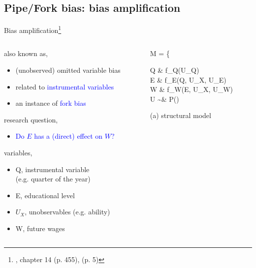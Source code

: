 \subsection{Pipe/Fork bias: bias amplification}
%
%
\begin{frame}[t, negative]
	\subsectionpage
\end{frame}
%
%
\begin{frame}
	{Bias amplification\footnote{\citet{McElreath_2020}, chapter 14 (p. 455), \citet{Cinelli_et_al_2021} (p. 5)}}
	\begin{columns}
		\begin{column}{0.5\textwidth}
			also known as,
			\begin{itemize}
				\item (unobserved) omitted variable bias
				\item related to \textcolor{blue}{instrumental variables}
				\item an instance of \textcolor{blue}{fork bias}
			\end{itemize}
			
			research question, 
			\begin{itemize}
				\item \textcolor{blue}{Do $E$ has a (direct) effect on $W$?}
			\end{itemize}
			
			variables,
			\begin{itemize}
				\item Q, instrumental variable \\
				(e.g. quarter of the year)
				\item E, educational level
				\item $U_{X}$, unobservables (e.g. ability)
				\item W, future wages
			\end{itemize}
		\end{column}
		\begin{column}{0.5\textwidth}  
			\begin{equ}
				M = \left\{ \begin{aligned} 
					Q \leftarrow & \; f_{Q}(U_{Q}) \\
					E \leftarrow & \; f_{E}(Q, U_{X}, U_{E}) \\
					W \leftarrow & \; f_{W}(E, U_{X}, U_{W}) \\
					U \sim & \; P()
				\end{aligned} \right
				\caption*{(a) structural model}
			\end{equ}
			\begin{figure}
\end{figure}
\end{column}
\end{columns}
\end{frame}
